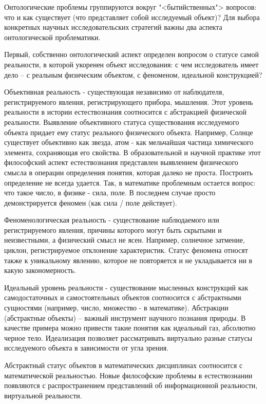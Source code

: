 \documentclass[exam_answers.tex]{subfiles}
\begin{document}
\renewcommand{\baselinestretch}{\blch}

Онтологические проблемы группируются вокруг "<бытийственных"> вопросов: что и как существует (что представляет собой исследуемый объект)?
Для выбора конкретных научных исследовательских стратегий важны два аспекта онтологической проблематики.

Первый, собственно онтологический аспект определен вопросом о статусе
самой реальности, в которой укоренен объект исследования: с чем
исследователь имеет дело – с реальным физическим объектом, с феноменом,
идеальной конструкцией?

Объективная реальность - существующая независимо от наблюдателя,
регистрируемого явления, регистрирующего прибора, мышления. Этот уровень
реальности в истории естествознания соотносится с абстракцией физической
реальности. Выявление объективного статуса существования исследуемого
объекта придает ему статус реального физического объекта. Например, Солнце
существует объективно как звезда, атом - как мельчайшая частица химического
элемента, сохраняющая его свойства. В образовательной и научной практике
этот философский аспект естествознания представлен выявлением физического
смысла в операции определения понятия, которая далеко не проста. Построить
определение не всегда удается. Так, в математике проблемным остается вопрос:
что такое число, в физике - сила, поле. В последнем случае просто
демонстрируется феномен (как сила / поле действует).

Феноменологическая реальность - существование наблюдаемого или
регистрируемого явления, причины которого могут быть скрытыми и
неизвестными, а физический смысл не ясен. Например, солнечное затмение,
циклон, регистрируемое отклонение характеристик. Статус феномена относят
также к уникальному явлению, которое не повторяется и не укладывается ни в
какую закономерность.

Идеальный уровень реальности - существование мысленных конструкций
как самодостаточных и самостоятельных объектов соотносится с абстрактными
сущностями (например, число, множество - в математике). Абстракции
(абстрактные объекты) – важный инструмент научного познания природы. В
качестве примера можно привести такие понятия как идеальный газ, абсолютно
черное тело. Идеализация позволяет рассматривать виртуально разные статусы
исследуемого объекта в зависимости от угла зрения.

Абстрактный статус объектов в математических дисциплинах соотносится
с математической реальностью. Новые философские проблемы в
естествознании появляются с распространением представлений об
информационной реальности, виртуальной реальности.
\end{document}
